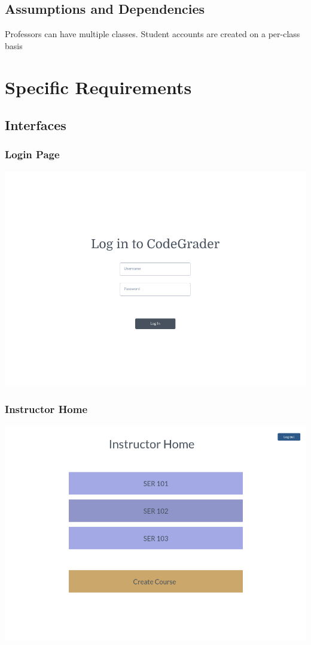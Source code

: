 \documentclass{article}
\begin{document}
\subsection{Assumptions and Dependencies}
Professors can have multiple classes. Student accounts are created on a per-class basis


\newpage
\section{Specific Requirements}

\subsection{Interfaces}

\subsubsection{Login Page}
\includegraphics[width=0.8\linewidth]{WireframeLogin.png}

\subsubsection{Instructor Home}
\includegraphics[width=0.8\linewidth]{InstructorHome.png}
\end{document}
